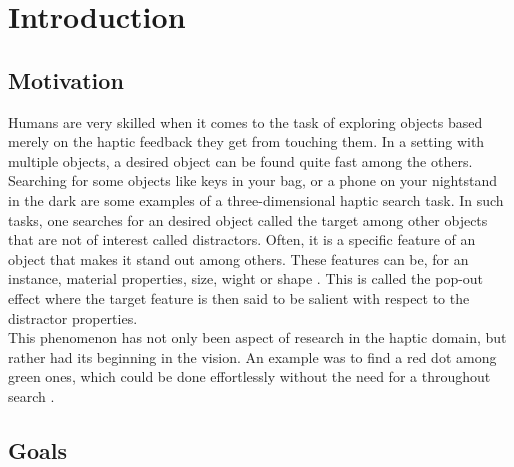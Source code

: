 
\chapter{Introduction} %

\label{Introduction} %


\newcommand{\keyword}[1]{\textbf{#1}}
\newcommand{\tabhead}[1]{\textbf{#1}}
\newcommand{\code}[1]{\texttt{#1}}
\newcommand{\file}[1]{\texttt{\bfseries#1}}
\newcommand{\option}[1]{\texttt{\itshape#1}}

\section{Motivation}
Humans are very skilled when it comes to the task of exploring objects based merely on the haptic feedback they get from touching them. In a setting with multiple objects, a desired object can be found quite fast among the others. Searching for some objects like keys in your bag, or a phone on your nightstand in the dark are some examples of a three-dimensional haptic search task. In such tasks, one searches for an desired object called the target among other objects that are not of interest called distractors. Often, it is a specific feature of an object that makes it stand out among others. These features can be, for an instance, material properties, size, wight or shape \cite{HapticShape}. This is called the pop-out effect where the target feature is then said to be salient with respect to the distractor properties. \\
This phenomenon has not only been aspect of research in the haptic domain, but rather had its beginning in the vision. An example was to find a red dot among green ones, which could be done effortlessly without the need for a throughout search \cite{treisman_gormican_1988}. 
\section{Goals} \label{Goals}